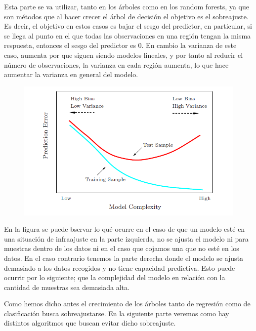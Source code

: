 \noindent Esta parte se va utilizar, tanto en los árboles como en los random forests, ya que son métodos que al hacer crecer el árbol de decisión el objetivo es el sobreajuste. Es decir, el objetivo en estos casos es bajar el sesgo del predictor, en particular, si se llega al punto en el que todas las observaciones en una región tengan la misma respuesta, entonces el sesgo del predictor es 0. En cambio la varianza de este caso, aumenta por que siguen siendo modelos lineales, y por tanto al reducir el número de observaciones, la varianza en cada región aumenta, lo que hace aumentar la varianza en general del modelo. 

\begin{figure}[h]
\centering
\includegraphics[scale=0.4]{Documentos Extra/Imagenes/Bias-Variance-Tradeoff.png}
\end{figure}
 
\noindent En la figura se puede bservar lo qué ocurre en el caso de que un modelo esté en una situación de infraajuste en la parte izquierda, no se ajusta el modelo ni para muestras dentro de los datos ni en el caso que cojamos una que no esté en los datos. En el caso contrario tenemos la parte derecha donde el modelo se ajusta demasiado a los datos recogidos y no tiene capacidad predictiva. Esto puede ocurrir por lo siguiente; que la complejidad del modelo en relación con la cantidad de muestras sea demasiada alta. 

\noindent Como hemos dicho antes el crecimiento de los árboles tanto de regresión como de clasificación busca sobreajustarse. En la siguiente parte veremos como hay distintos algoritmos que buscan evitar dicho sobreajuste. 

 
